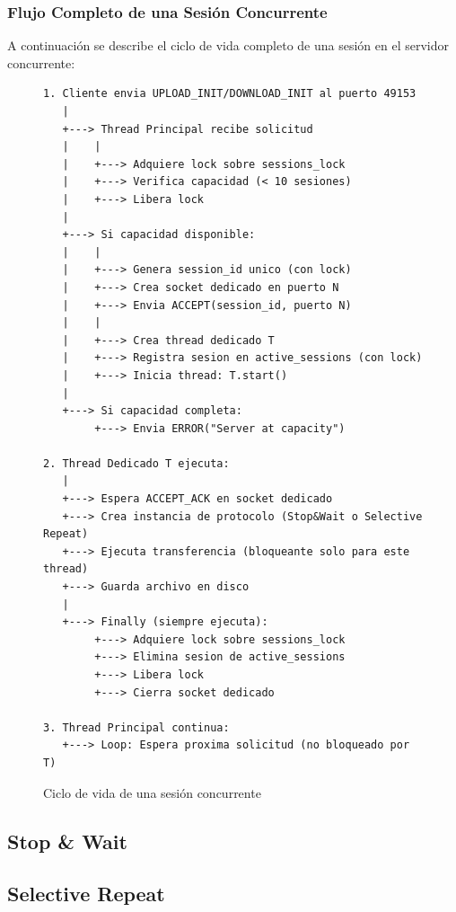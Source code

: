\subsubsection{Flujo Completo de una Sesión Concurrente}

A continuación se describe el ciclo de vida completo de una sesión en el servidor concurrente:

\begin{figure}[H]
\centering
\small
\begin{minipage}{0.9\textwidth}
\begin{verbatim}
1. Cliente envia UPLOAD_INIT/DOWNLOAD_INIT al puerto 49153
   |
   +---> Thread Principal recibe solicitud
   |    |
   |    +---> Adquiere lock sobre sessions_lock
   |    +---> Verifica capacidad (< 10 sesiones)
   |    +---> Libera lock
   |
   +---> Si capacidad disponible:
   |    |
   |    +---> Genera session_id unico (con lock)
   |    +---> Crea socket dedicado en puerto N
   |    +---> Envia ACCEPT(session_id, puerto N)
   |    |
   |    +---> Crea thread dedicado T
   |    +---> Registra sesion en active_sessions (con lock)
   |    +---> Inicia thread: T.start()
   |
   +---> Si capacidad completa:
        +---> Envia ERROR("Server at capacity")

2. Thread Dedicado T ejecuta:
   |
   +---> Espera ACCEPT_ACK en socket dedicado
   +---> Crea instancia de protocolo (Stop&Wait o Selective Repeat)
   +---> Ejecuta transferencia (bloqueante solo para este thread)
   +---> Guarda archivo en disco
   |
   +---> Finally (siempre ejecuta):
        +---> Adquiere lock sobre sessions_lock
        +---> Elimina sesion de active_sessions
        +---> Libera lock
        +---> Cierra socket dedicado

3. Thread Principal continua:
   +---> Loop: Espera proxima solicitud (no bloqueado por T)
\end{verbatim}
\end{minipage}
\caption{Ciclo de vida de una sesión concurrente}
\end{figure}





\subsection{Stop \& Wait}
\subsection{Selective Repeat}
